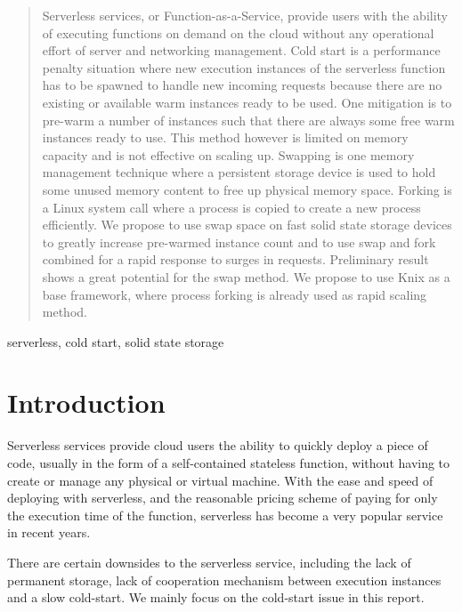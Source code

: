 \documentclass[conference]{IEEEtran}
\begin{document}
\begin{abstract}\label{abstract}
Serverless services, or Function-as-a-Service, provide users with the ability of executing functions on demand on the cloud without any operational effort of server and networking management. Cold start is a performance penalty situation where new execution instances of the serverless function has to be spawned to handle new incoming requests because there are no existing or available warm instances ready to be used. One mitigation is to pre-warm a number of instances such that there are always some free warm instances ready to use. This method however is limited on memory capacity and is not effective on scaling up. Swapping is one memory management technique where a persistent storage device is used to hold some unused memory content to free up physical memory space. Forking is a Linux system call where a process is copied to create a new process efficiently. We propose to use swap space on fast solid state storage devices to greatly increase pre-warmed instance count and to use swap and fork combined for a rapid response to surges in requests. Preliminary result shows a great potential for the swap method. We propose to use Knix as a base framework, where process forking is already used as rapid scaling method.
\end{abstract}

\begin{IEEEkeywords}
serverless, cold start, solid state storage
\end{IEEEkeywords}

\section{Introduction}
Serverless services provide cloud users the ability to quickly deploy a piece of code, usually in the form of a self-contained stateless function, without having to create or manage any physical or virtual machine. With the ease and speed of deploying with serverless, and the reasonable pricing scheme of paying for only the execution time of the function, serverless has become a very popular service in recent years. 

There are certain downsides to the serverless service, including the lack of permanent storage, lack of cooperation mechanism between execution instances and a slow cold-start\cite{hellersteinServerlessComputingOne2018,jonasCloudProgrammingSimplified2019}. We mainly focus on the cold-start issue in this report.
\end{document}
